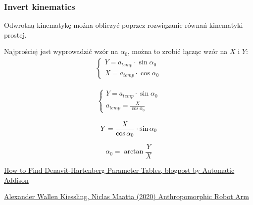 \documentclass[a4paper,13pt]{article}
\begin{document}
\subsubsection{Invert kinematics}
Odwrotną kinematykę można obliczyć poprzez rozwiązanie równań kinematyki prostej.

Najprościej jest wyprowadzić wzór na $\alpha_0$, można to zrobić łącząc wzór na $X$ i $Y$:
\begin{equation}
\begin{split}
\begin{cases}
Y = a_{temp} \cdot \sin{\alpha_0}\\
X = a_{temp} \cdot \cos{\alpha_0}
\end{cases}
\end{split}
\end{equation}

\begin{equation}
\begin{split}
\begin{cases}
Y = a_{temp} \cdot \sin{\alpha_0}\\
a_{temp} = \frac{X}{\cos{\alpha_0}}
\end{cases}
\end{split}
\end{equation}


\begin{equation}
Y = \frac{X}{\cos{\alpha_0}} \cdot \sin{\alpha_0}\\
\end{equation}

\begin{equation}
\alpha_0 = \arctan{\frac{Y}{X}}
\end{equation}


\begin{thebibliography}{9}
\href{https://automaticaddison.com/how-to-find-denavit-hartenberg-parameter-tables/}{How to Find Denavit-Hartenberg Parameter Tables, blogpost by Automatic Addison}

\bibitem{}
\href{https://www.diva-portal.org/smash/get/diva2:1462059/FULLTEXT01.pdf}{Alexander Wallen Kiessling, Niclas Maatta (2020) Anthropomorphic Robot Arm}

\end{thebibliography}
\end{document}
